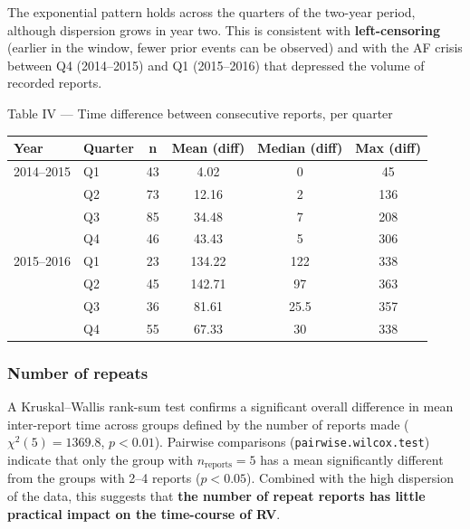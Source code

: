 \documentclass[11pt,a4paper,openany]{report}
\theoremstyle{definition}
\theoremstyle{plain}
\theoremstyle{remark}
\begin{document}
The exponential pattern holds across the quarters of the two-year period, although dispersion grows in year two. This is consistent with \textbf{left-censoring} (earlier in the window, fewer prior events can be observed) and with the AF crisis between Q4 (2014--2015) and Q1 (2015--2016) that depressed the volume of recorded reports.

\begin{datapanel}{Table IV --- Time difference between consecutive reports, per quarter}
\begin{center}
\begin{tabular}{llcccc}
\toprule
\textbf{Year} & \textbf{Quarter} & \textbf{n} & \textbf{Mean (diff)} & \textbf{Median (diff)} & \textbf{Max (diff)} \\
\midrule
2014--2015 & Q1 & 43 & 4.02   & 0    & 45 \\
           & Q2 & 73 & 12.16  & 2    & 136 \\
           & Q3 & 85 & 34.48  & 7    & 208 \\
           & Q4 & 46 & 43.43  & 5    & 306 \\
2015--2016 & Q1 & 23 & 134.22 & 122  & 338 \\
           & Q2 & 45 & 142.71 & 97   & 363 \\
           & Q3 & 36 & 81.61  & 25.5 & 357 \\
           & Q4 & 55 & 67.33  & 30   & 338 \\
\bottomrule
\end{tabular}
\end{center}
\end{datapanel}

\subsubsection*{Number of repeats}

A Kruskal--Wallis rank-sum test confirms a significant overall difference in mean inter-report time across groups defined by the number of reports made ($\chi^2(5) = 1369.8$, $p < 0.01$). Pairwise comparisons (\texttt{pairwise.wilcox.test}) indicate that only the group with $n_\text{reports} = 5$ has a mean significantly different from the groups with 2--4 reports ($p < 0.05$). Combined with the high dispersion of the data, this suggests that \textbf{the number of repeat reports has little practical impact on the time-course of RV}.
\end{document}
